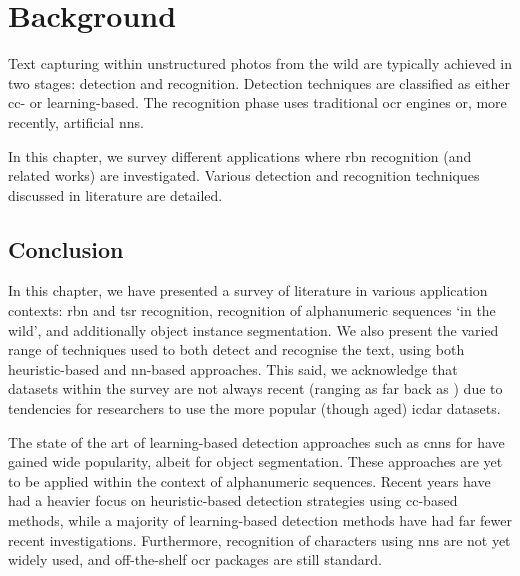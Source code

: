 \chapter{Background}
\label{ch:background}


Text capturing within unstructured photos from the wild are typically achieved in two stages: detection and recognition. Detection techniques are classified as either \gls{cc}- or learning-based. The recognition phase uses traditional \gls{ocr} engines or, more recently, artificial \glspl{nn}. 

In this chapter, we survey different applications where \gls{rbn} recognition (and related works) are investigated. Various detection and recognition techniques discussed in literature are detailed.





\newpage
\section*{Conclusion}

In this chapter, we have presented a survey of literature in various application contexts: \gls{rbn} and \gls{tsr} recognition, recognition of alphanumeric sequences `in the wild', and additionally object instance segmentation. We also present the varied range of techniques used to both detect and recognise the text, using both heuristic-based and \gls{nn}-based approaches. This said, we acknowledge that datasets within the survey are not always recent (ranging as far back as \citeyear{Lucas:2003iw}) due to tendencies for researchers to use the more popular (though aged) \gls{icdar} datasets.

The state of the art of learning-based detection approaches such as \glspl{cnn} for have gained wide popularity, albeit for object segmentation. These approaches are yet to be applied within the context of alphanumeric sequences. Recent years have had a heavier focus on heuristic-based detection strategies using \gls{cc}-based methods, while a majority of learning-based detection methods have had far fewer recent investigations. Furthermore, recognition of characters using \glspl{nn} are not yet widely used, and off-the-shelf \gls{ocr} packages are still standard.